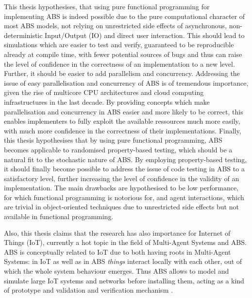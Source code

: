 This thesis hypothesises, that using pure functional programming for implementing ABS is indeed possible due to the pure computational character of most ABS models, not relying on unrestricted side effects of asynchronous, non-deterministic Input/Output (IO) and direct user interaction. This should lead to simulations which are easier to test and verify, guaranteed to be reproducible already at compile time, with fewer potential sources of bugs and thus can raise the level of confidence in the correctness of an implementation to a new level. Further, it should be easier to add parallelism and concurrency. Addressing the issue of easy parallelisation and concurrency of ABS is of tremendous importance, given the rise of multicore CPU architectures and cloud computing infrastructures in the last decade. By providing concepts which make parallelisation and concurrency in ABS easier and more likely to be correct, this enables implementers to fully exploit the available ressources much more easily, with much more confidence in the correctness of their implementations. Finally, this thesis hypothesises that by using pure functional programming, ABS becomes applicable to randomised property-based testing, which should be a natural fit to the stochastic nature of ABS. By employing property-based testing, it should finally become possible to address the issue of code testing in ABS to a satisfactory level, further increasing the level of confidence in the validity of an implementation. The main drawbacks are hypothesised to be low performance, for which functional programming is notorious for, and agent interactions, which are trivial in object-oriented techniques due to unrestricted side effects but not available in functional programming. 

Also, this thesis claims that the research has also importance for Internet of Things (IoT), currently a hot topic in the field of Multi-Agent Systems and ABS. ABS is conceptually related to IoT due to both having roots in Multi-Agent Systems: in IoT as well as in ABS \textit{things} interact locally with each other, out of which the whole system behaviour emerges. Thus ABS allows to model and simulate large IoT systems and networks before installing them, acting as a kind of prototype and validation and verification mechanism \cite{savaglio_agent-based_2018}.

